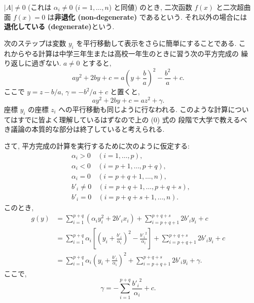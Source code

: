 \documentclass[12pt,twoside]{jarticle}
\begin{document}
$|A|\ne 0$ (これは $\alpha_i\ne 0$ ($i=1,\dots,n$) と同値) のとき,
二次函数 $f(x)$ と二次超曲面 $f(x)=0$ は{\bf 非退化 (non-degenerate)} 
であるという.  それ以外の場合には{\bf 退化している (degenerate)}という.

\medskip

次のステップは変数 $y_i$ を平行移動して表示をさらに簡単にすることである.  
これからやる計算は中学三年生または高校一年生のときに習う次の平方完成の
繰り返しに過ぎない.  $a\ne 0$ とすると,
\begin{equation*}
  ay^2 + 2by + c = a \left(y + \frac{b}{a}\right)^2 - \frac{b^2}{a} + c.
\end{equation*}
ここで $y = z - b/a$, $\gamma = - b^2/a + c$ と置くと, 
\begin{equation*}
  ay^2 + 2by + c = a z^2 + \gamma.
\end{equation*}
座標 $y_i$ の座標 $z_i$ への平行移動も同じように行なわれる.
このような計算についてはすでに皆よく理解しているはずなので上の (0) 式の
段階で大学で教えるべき議論の本質的な部分は終了していると考えられる. 

さて, 平方完成の計算を実行するために次のように仮定する:
\begin{align*}
  &
  \alpha_i>0 \quad (i=1,\dots,p), 
  \\ &
  \alpha_i<0 \quad (i=p+1,\dots,p+q),
  \\ &
  \alpha_i=0 \quad (i=p+q+1,\dots,n),
  \\ &
  b'_i\ne 0 \quad (i=p+q+1,\dots,p+q+s),
  \\ &
  b'_i=0 \quad (i=p+q+s+1,\dots,n).
\end{align*}
このとき,
\begin{align*}
  g(y) &
  = \sum_{i=1}^{p+q} (\alpha_i y_i^2 + 2b'_i x_i) 
  + \sum_{i=p+q+1}^{p+q+s} 2b'_i y_i
  + c
  \\ &
  = \sum_{i=1}^{p+q} \alpha_i \left[
      \left( y_i + \frac{b'_i}{\alpha_i} \right)^2 - \frac{{b'_i}^2}{\alpha_i}
    \right]
  + \sum_{i=p+q+1}^{p+q+s} 2b'_i y_i
  + c
  \\ &
  = \sum_{i=1}^{p+q} \alpha_i \left(y_i + \frac{b'_i}{\alpha_i}\right)^2
  + \sum_{i=p+q+1}^{p+q+s} 2b'_i y_i
  + \gamma.
\end{align*}
ここで,
\begin{equation*}
  \gamma = 
  - \sum_{i=1}^{p+q} \frac{{b'_i}^2}{\alpha_i} 
  + c.
\end{equation*}
\end{document}
